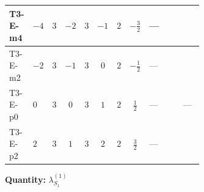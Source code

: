 \documentclass[8pt]{article}
\begin{document}
\begin{landscape}
\begin{longtable}{@{}llcccccc >{\raggedright\arraybackslash}p{0.21\linewidth} >{\raggedright\arraybackslash}p{0.21\linewidth} >{\raggedright\arraybackslash}p{0.21\linewidth}@{}}
\midrule
T3-E-m4 & $-4$ & $3$ & $-2$ & $3$ & $-1$ & $2$ & $-\frac{3}{2}$ & --- & \scriptsize\adjustbox{max width=\linewidth}{$\begin{gathered} -3 \operatorname{Tr}\!\left({y_1}\,\left({y_1}\right)^{\dagger}\,{y_1}\,\left({y_1}\right)^{\dagger}\right)\end{gathered}$} & \scriptsize\adjustbox{max width=\linewidth}{$\begin{gathered} +192 {g_1}^4\end{gathered}$} \\
\midrule
T3-E-m2 & $-2$ & $3$ & $-1$ & $3$ & $0$ & $2$ & $-\frac{1}{2}$ & --- & \scriptsize\adjustbox{max width=\linewidth}{$\begin{gathered} -3 \operatorname{Tr}\!\left({y_1}\,\left({y_1}\right)^{\dagger}\,{y_1}\,\left({y_1}\right)^{\dagger}\right)\end{gathered}$} & \scriptsize\adjustbox{max width=\linewidth}{$\begin{gathered} +12 {g_1}^4\end{gathered}$} \\
\midrule
T3-E-p0 & $0$ & $3$ & $0$ & $3$ & $1$ & $2$ & $\frac{1}{2}$ & --- & \scriptsize\adjustbox{max width=\linewidth}{$\begin{gathered} -3 \operatorname{Tr}\!\left({y_1}\,\left({y_1}\right)^{\dagger}\,{y_1}\,\left({y_1}\right)^{\dagger}\right)\end{gathered}$} & --- \\
\midrule
T3-E-p2 & $2$ & $3$ & $1$ & $3$ & $2$ & $2$ & $\frac{3}{2}$ & --- & \scriptsize\adjustbox{max width=\linewidth}{$\begin{gathered} -3 \operatorname{Tr}\!\left({y_1}\,\left({y_1}\right)^{\dagger}\,{y_1}\,\left({y_1}\right)^{\dagger}\right)\end{gathered}$} & \scriptsize\adjustbox{max width=\linewidth}{$\begin{gathered} +12 {g_1}^4\end{gathered}$} \\
\midrule
\bottomrule
\end{longtable}
\clearpage
\noindent\textbf{Quantity: }$\lambda_{S_1}^{(1)}$\par\smallskip

\end{landscape}
\end{document}
